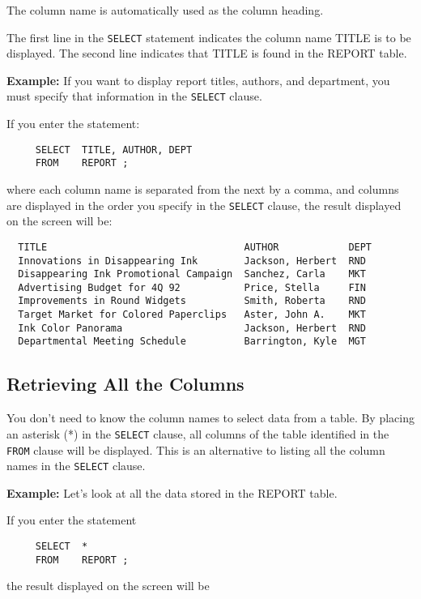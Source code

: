 The column name is automatically used as the column heading.

The first line in the \verb`SELECT` statement indicates the column name TITLE
is to be displayed.  The second line indicates that TITLE is found in
the REPORT table.

{\bf Example:}
If you want to display report titles, authors, and department, you
must specify that information in the \verb`SELECT` clause.

If you enter the statement:
\begin{verbatim}
     SELECT  TITLE, AUTHOR, DEPT
     FROM    REPORT ;
\end{verbatim}
where each column name is separated from the next by a comma, and
columns are displayed in the order you specify in the \verb`SELECT` clause,
the result displayed on the screen will be:

\begin{screen}
\begin{verbatim}
  TITLE                                  AUTHOR            DEPT
  Innovations in Disappearing Ink        Jackson, Herbert  RND
  Disappearing Ink Promotional Campaign  Sanchez, Carla    MKT
  Advertising Budget for 4Q 92           Price, Stella     FIN
  Improvements in Round Widgets          Smith, Roberta    RND
  Target Market for Colored Paperclips   Aster, John A.    MKT
  Ink Color Panorama                     Jackson, Herbert  RND
  Departmental Meeting Schedule          Barrington, Kyle  MGT
\end{verbatim}
\end{screen}

\subsection{Retrieving All the Columns}

You don't need to know the column names to select data from a table.
By placing an asterisk (*) in the \verb`SELECT` clause, all columns of the
table identified in the \verb`FROM` clause will be displayed.  This is an
alternative to listing all the column names in the \verb`SELECT` clause.

{\bf Example:}
Let's look at all the data stored in the REPORT table.

If you enter the statement
\begin{verbatim}
     SELECT  *
     FROM    REPORT ;
\end{verbatim}
the result displayed on the screen will be

